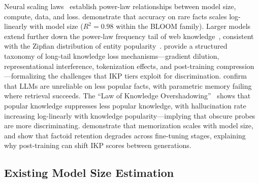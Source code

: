 \documentclass[11pt]{article}
\begin{document}
Neural scaling laws~\citep{kaplan2020scaling, hoffmann2022training} establish power-law relationships between model size, compute, data, and loss. \citet{kandpal2023} demonstrate that accuracy on rare facts scales log-linearly with model size ($R^2 = 0.98$ within the BLOOM family). Larger models extend further down the power-law frequency tail of web knowledge~\citep{tirumala2022}, consistent with the Zipfian distribution of entity popularity~\citep{zipf1949human, piantadosi2014zipf}. \citet{badhe2026longtail} provide a structured taxonomy of long-tail knowledge loss mechanisms---gradient dilution, representational interference, tokenization effects, and post-training compression---formalizing the challenges that IKP tiers exploit for discrimination. \citet{mallen2023trust} confirm that LLMs are unreliable on less popular facts, with parametric memory failing where retrieval succeeds. The ``Law of Knowledge Overshadowing''~\citep{overshadow2025} shows that popular knowledge suppresses less popular knowledge, with hallucination rate increasing log-linearly with knowledge popularity---implying that obscure probes are more discriminating. \citet{carlini2021extracting, carlini2023quantifying} demonstrate that memorization scales with model size, and \citet{chen2025factoids} show that factoid retention degrades across fine-tuning stages, explaining why post-training can shift IKP scores between generations.

\subsection{Existing Model Size Estimation}
\end{document}
